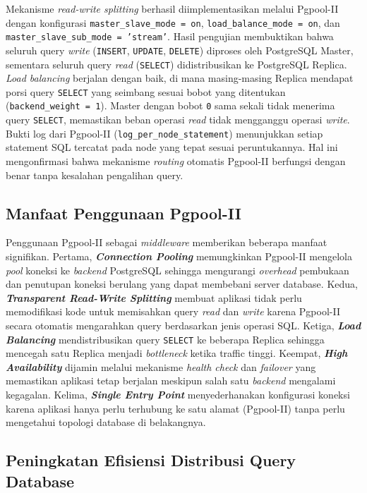 Mekanisme \textit{read-write splitting} berhasil diimplementasikan
melalui Pgpool-II dengan konfigurasi
\texttt{master\_slave\_mode = on},
\texttt{load\_balance\_mode = on}, dan
\texttt{master\_slave\_sub\_mode = 'stream'}. Hasil pengujian
membuktikan bahwa seluruh query \textit{write} (\texttt{INSERT},
\texttt{UPDATE}, \texttt{DELETE}) diproses oleh PostgreSQL Master,
sementara seluruh query \textit{read} (\texttt{SELECT})
didistribusikan ke PostgreSQL Replica. \textit{Load balancing}
berjalan dengan baik, di mana masing-masing Replica mendapat porsi query
\texttt{SELECT} yang seimbang sesuai bobot yang ditentukan
(\texttt{backend\_weight = 1}). Master dengan bobot \texttt{0}
sama sekali tidak menerima query \texttt{SELECT}, memastikan beban
operasi \textit{read} tidak mengganggu operasi \textit{write}. Bukti
log dari Pgpool-II (\texttt{log\_per\_node\_statement}) menunjukkan
setiap statement SQL tercatat pada node yang tepat sesuai
peruntukannya. Hal ini mengonfirmasi bahwa mekanisme \textit{routing}
otomatis Pgpool-II berfungsi dengan benar tanpa kesalahan
pengalihan query.

\subsection{Manfaat Penggunaan Pgpool-II}

Penggunaan Pgpool-II sebagai \textit{middleware} memberikan beberapa
manfaat signifikan. Pertama, \textbf{\textit{Connection Pooling}}
memungkinkan Pgpool-II mengelola \textit{pool} koneksi ke
\textit{backend} PostgreSQL sehingga mengurangi \textit{overhead}
pembukaan dan penutupan koneksi berulang yang dapat membebani server
database. Kedua, \textbf{\textit{Transparent Read-Write Splitting}}
membuat aplikasi tidak perlu memodifikasi kode untuk memisahkan query
\textit{read} dan \textit{write} karena Pgpool-II secara otomatis
mengarahkan query berdasarkan jenis operasi SQL. Ketiga,
\textbf{\textit{Load Balancing}} mendistribusikan query
\texttt{SELECT} ke beberapa Replica sehingga mencegah satu Replica
menjadi \textit{bottleneck} ketika traffic tinggi. Keempat,
\textbf{\textit{High Availability}} dijamin melalui mekanisme
\textit{health check} dan \textit{failover} yang memastikan aplikasi
tetap berjalan meskipun salah satu \textit{backend} mengalami
kegagalan. Kelima, \textbf{\textit{Single Entry Point}}
menyederhanakan konfigurasi koneksi karena aplikasi hanya perlu
terhubung ke satu alamat (Pgpool-II) tanpa perlu mengetahui topologi
database di belakangnya.

\subsection{Peningkatan Efisiensi Distribusi Query Database}

